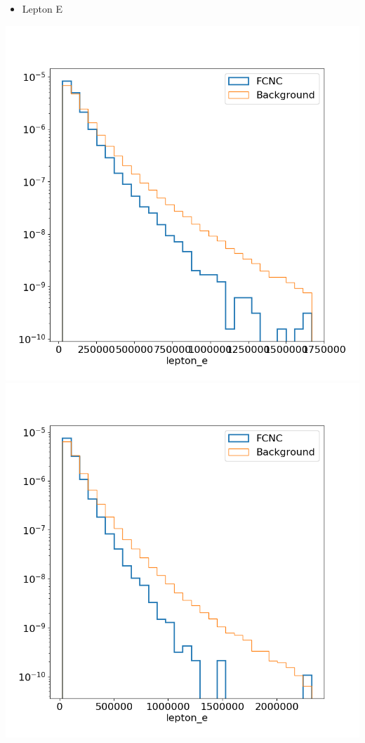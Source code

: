 \documentclass[10pt]{beamer}
\begin{document}
{\begin{columns}
\begin{column}{0.33\textwidth}
\begin{itemize}
\item Lepton E
\end{itemize}
\includegraphics[width=.85\textwidth]{Images/ejetsvarplots/lepton_e.png} \\
\includegraphics[width=.85\textwidth]{Images/mujetsvarplots/lepton_e.png}
\end{column}
\end{columns}
}
\end{document}
